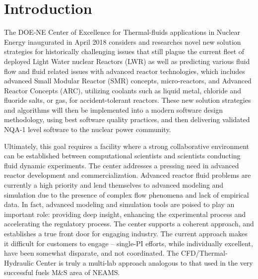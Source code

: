 \section{Introduction}
\label{s:intro}

The DOE-NE Center of Excellence for Thermal-fluids applications in Nuclear Energy inaugurated in April 2018 considers and researches novel new solution strategies for historically challenging issues that still plague the current fleet of deployed Light Water nuclear Reactors (LWR) as well as predicting various fluid flow and fluid related issues with advanced reactor technologies, which includes advanced Small Modular Reactor (SMR) concepts, micro-reactors, and Advanced Reactor Concepts (ARC), utilizing coolants such as liquid metal, chloride and  fluoride salts, or gas, for accident-tolerant reactors.
These new solution strategies and algorithms will then be implemented into a modern software design methodology, using best software quality practices, and then delivering validated NQA-1 level software to the nuclear power community.

Ultimately, this goal requires a facility where a strong collaborative environment can be established between computational scientists and scientists conducting fluid dynamic experiments.
The center addresses a pressing need in advanced reactor development and commercialization.
Advanced reactor fluid problems are currently a high priority and lend themselves to advanced modeling and simulation due to the presence of complex flow phenomena and lack of empirical data.
In fact, advanced modeling and simulation tools are poised to play an important role: providing deep insight, enhancing the experimental process and accelerating the regulatory process.
The center supports a coherent approach, and establishes a true front door for engaging industry.
The current approach makes it difficult for customers to engage -- single-PI efforts, while individually excellent, have been somewhat disparate, and not coordinated.
The CFD/Thermal-Hydraulic Center is truly a multi-lab approach analogous to that used in the very successful fuels M\&S area of NEAMS.

